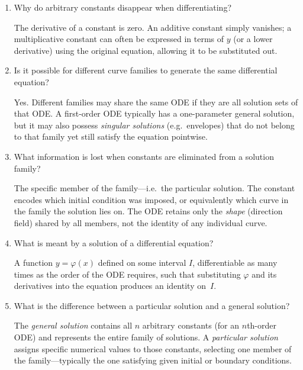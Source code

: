 \documentclass{essay}
\begin{document}
\begin{enumerate}[leftmargin=*, itemsep=8pt]
  \item Why do arbitrary constants disappear when differentiating?

    \begin{answer} The derivative of a constant is zero.  An
      additive constant simply vanishes; a multiplicative constant can
      often be expressed in terms of $y$ (or a lower derivative) using
      the original equation, allowing it to be substituted out.
    \end{answer}

  \item Is it possible for different curve families to generate the
    same differential equation?

    \begin{answer} Yes.  Different families may share the same ODE
      if they are all solution sets of that ODE.  A first-order ODE
      typically has a one-parameter general solution, but it may also
      possess \emph{singular solutions} (e.g.\ envelopes) that do not
      belong to that family yet still satisfy the equation pointwise.
    \end{answer}

  \item What information is lost when constants are eliminated from a
    solution family?

    \begin{answer} The specific member of the family---i.e.\ the
      particular solution.  The constant encodes which initial
      condition was imposed, or equivalently which curve in the family
      the solution lies on.  The ODE retains only the \emph{shape}
      (direction field) shared by all members, not the identity of any
      individual curve.
    \end{answer}

  \item What is meant by a solution of a differential equation?

    \begin{answer} A function $y=\varphi(x)$ defined on some
      interval $I$, differentiable as many times as the order of the
      ODE requires, such that substituting $\varphi$ and its
      derivatives into the equation produces an identity on~$I$.
    \end{answer}

  \item What is the difference between a particular solution and a
    general solution?

    \begin{answer} The \emph{general solution} contains all $n$
      arbitrary constants (for an $n$th-order ODE) and represents the
      entire family of solutions.  A \emph{particular solution} assigns
      specific numerical values to those constants, selecting one
      member of the family---typically the one satisfying given initial
      or boundary conditions.
    \end{answer}


\end{enumerate}
\end{document}
